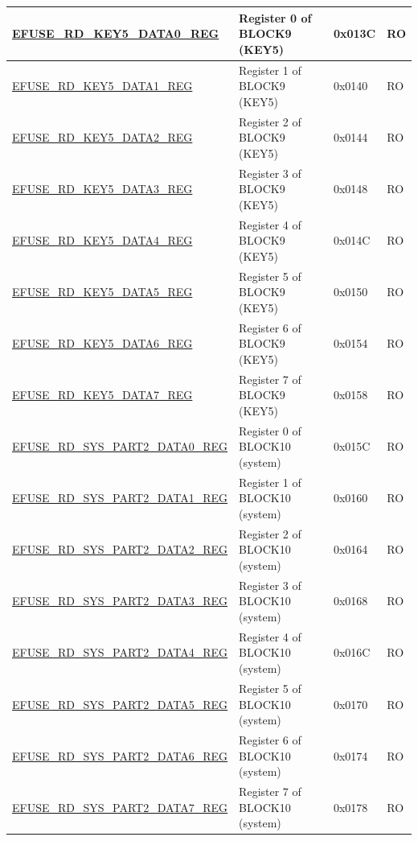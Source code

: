 \begin{longtable}{ | p{5.8cm} | p{7cm} | p{1.3cm} | p{1.2cm} | }
\hyperref[regdesc:EFUSERDKEY5DATA0REG]{EFUSE\_RD\_KEY5\_DATA0\_REG} & Register 0 of BLOCK9 (KEY5) & 0x013C & RO \\ \hline
\hyperref[regdesc:EFUSERDKEY5DATA1REG]{EFUSE\_RD\_KEY5\_DATA1\_REG} & Register 1 of BLOCK9 (KEY5) & 0x0140 & RO \\ \hline
\hyperref[regdesc:EFUSERDKEY5DATA2REG]{EFUSE\_RD\_KEY5\_DATA2\_REG} & Register 2 of BLOCK9 (KEY5) & 0x0144 & RO \\ \hline
\hyperref[regdesc:EFUSERDKEY5DATA3REG]{EFUSE\_RD\_KEY5\_DATA3\_REG} & Register 3 of BLOCK9 (KEY5) & 0x0148 & RO \\ \hline
\hyperref[regdesc:EFUSERDKEY5DATA4REG]{EFUSE\_RD\_KEY5\_DATA4\_REG} & Register 4 of BLOCK9 (KEY5) & 0x014C & RO \\ \hline
\hyperref[regdesc:EFUSERDKEY5DATA5REG]{EFUSE\_RD\_KEY5\_DATA5\_REG} & Register 5 of BLOCK9 (KEY5) & 0x0150 & RO \\ \hline
\hyperref[regdesc:EFUSERDKEY5DATA6REG]{EFUSE\_RD\_KEY5\_DATA6\_REG} & Register 6 of BLOCK9 (KEY5) & 0x0154 & RO \\ \hline
\hyperref[regdesc:EFUSERDKEY5DATA7REG]{EFUSE\_RD\_KEY5\_DATA7\_REG} & Register 7 of BLOCK9 (KEY5) & 0x0158 & RO \\ \hline
\hyperref[regdesc:EFUSERDSYSPART2DATA0REG]{EFUSE\_RD\_SYS\_PART2\_DATA0\_REG} & Register 0 of BLOCK10 (system) & 0x015C & RO \\ \hline
\hyperref[regdesc:EFUSERDSYSPART2DATA1REG]{EFUSE\_RD\_SYS\_PART2\_DATA1\_REG} & Register 1 of BLOCK10 (system) & 0x0160 & RO \\ \hline
\hyperref[regdesc:EFUSERDSYSPART2DATA2REG]{EFUSE\_RD\_SYS\_PART2\_DATA2\_REG} & Register 2 of BLOCK10 (system) & 0x0164 & RO \\ \hline
\hyperref[regdesc:EFUSERDSYSPART2DATA3REG]{EFUSE\_RD\_SYS\_PART2\_DATA3\_REG} & Register 3 of BLOCK10 (system) & 0x0168 & RO \\ \hline
\hyperref[regdesc:EFUSERDSYSPART2DATA4REG]{EFUSE\_RD\_SYS\_PART2\_DATA4\_REG} & Register 4 of BLOCK10 (system) & 0x016C & RO \\ \hline
\hyperref[regdesc:EFUSERDSYSPART2DATA5REG]{EFUSE\_RD\_SYS\_PART2\_DATA5\_REG} & Register 5 of BLOCK10 (system) & 0x0170 & RO \\ \hline
\hyperref[regdesc:EFUSERDSYSPART2DATA6REG]{EFUSE\_RD\_SYS\_PART2\_DATA6\_REG} & Register 6 of BLOCK10 (system) & 0x0174 & RO \\ \hline
\hyperref[regdesc:EFUSERDSYSPART2DATA7REG]{EFUSE\_RD\_SYS\_PART2\_DATA7\_REG} & Register 7 of BLOCK10 (system) & 0x0178 & RO \\ \hline

\end{longtable}
